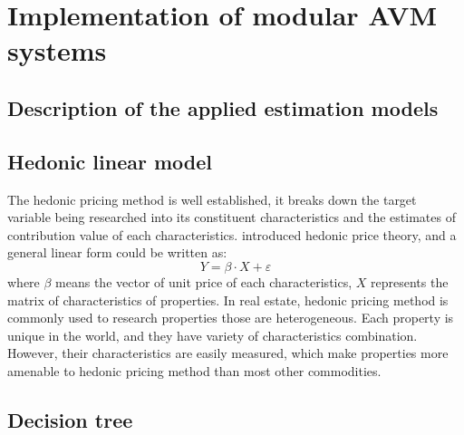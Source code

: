 \documentclass[12pt,a4paper]{article}
\begin{document}
\section{Implementation of modular AVM systems}

\subsection{Description of the applied estimation models}

\subsection*{Hedonic linear model}

The hedonic pricing method is well established, it breaks down the target variable being researched into its constituent characteristics and the estimates of contribution value of each characteristics. \citet{rosen74} introduced hedonic price theory, and a general linear form could be written as:
\begin{equation}
Y = \beta \cdot X + \varepsilon
\end{equation}   
where $\beta$ means the vector of unit price of each characteristics, $X$ represents the matrix of characteristics of properties. In real estate, hedonic pricing method is commonly used to research properties those are heterogeneous. Each property is unique in the world, and they have variety of characteristics combination. However, their characteristics are easily measured, which make properties more amenable to hedonic pricing method than most other commodities.

\subsection*{Decision tree}
\end{document}
